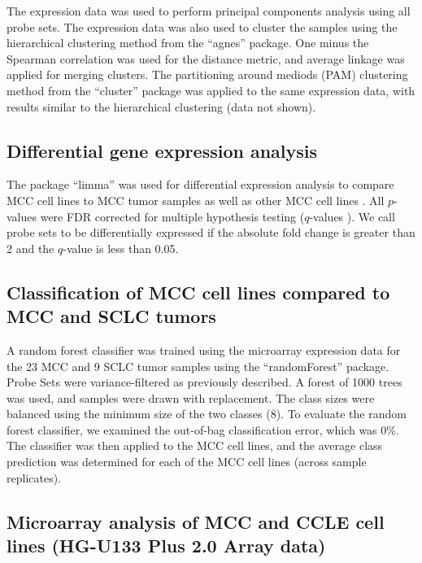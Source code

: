\documentclass[10pt]{article}
\begin{document}
The expression data was used to perform principal components analysis using all probe sets.
The expression data was also used to cluster the samples using the hierarchical clustering method from the ``agnes'' package.
One minus the Spearman correlation was used for the distance metric, and average linkage was applied for merging clusters.
The partitioning around mediods (PAM) clustering method from the ``cluster'' package was applied to the same expression data, with results similar to the hierarchical clustering (data not shown).

\subsection*{Differential gene expression analysis}

The package ``limma'' was used for differential expression analysis to compare MCC cell lines to MCC tumor samples as well as other MCC cell lines \citep{Smyth2004Linear,Smyth2005Limma}.
All $p$-values were FDR corrected for multiple hypothesis testing ($q$-values \citep{Benjamini1995Controlling}).
We call probe sets to be differentially expressed if the absolute fold change is greater than 2 and the $q$-value is less than 0.05.

\subsection*{Classification of MCC cell lines compared to MCC and SCLC tumors}

A random forest classifier was trained using the microarray expression data for the 23 MCC and 9 SCLC tumor samples using the ``randomForest'' package.
Probe Sets were variance-filtered as previously described.
A forest of 1000 trees was used, and samples were drawn with replacement.
The class sizes were balanced using the minimum size of the two classes (8).
To evaluate the random forest classifier, we examined the out-of-bag classification error, which was 0\%.
The classifier was then applied to the MCC cell lines, and the average class prediction was determined for each of the MCC cell lines (across sample replicates).

\subsection*{Microarray analysis of MCC and CCLE cell lines (HG-U133 Plus 2.0 Array data)}
\end{document}

